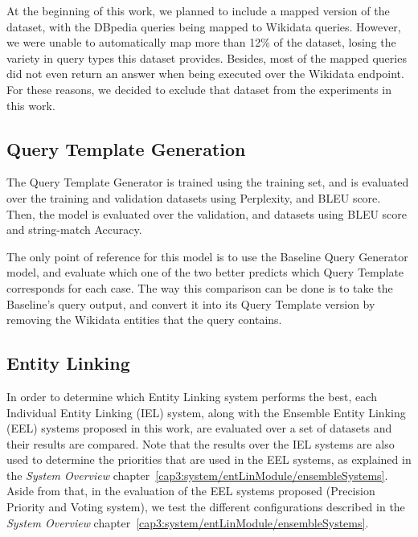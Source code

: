 At the beginning of this work, we planned to include a mapped version of the 
\DBNQA{}~\cite{dataset:dbnqa-hartmann-marx-soru-2018} dataset,
with the DBpedia queries being mapped to Wikidata queries. However, we were unable 
to automatically map more than 12\% of the dataset, losing the variety in query types this 
dataset provides. Besides, most of the mapped queries did not even return an answer when 
being executed over the Wikidata endpoint. For these reasons, we decided to exclude 
that dataset from the experiments in this work.

\subsection{Query Template Generation}
\label{cap4:experimentalDesign/queryTemplateGeneration}
The Query Template Generator is trained using the \LCQuADtwo{} training set, and is 
evaluated over the training and validation datasets using Perplexity, and BLEU score. 
Then, the model is evaluated over the \LCQuADtwo{} validation, \QALDseven{} and 
\WikiSPARQL{} datasets using BLEU score and string-match Accuracy.

The only point of reference for this model is to use the Baseline Query Generator model, and 
evaluate which one of the two better predicts which Query Template corresponds for each case. 
The way this comparison can be done is to take the Baseline's \SPARQL{} query output, and convert it 
into its Query Template version by removing the Wikidata entities that the query contains.

\subsection{Entity Linking}
\label{cap4:experimentalDesign/entityLinking}
In order to determine which Entity Linking system performs the best, each Individual Entity 
Linking (IEL) system, along with the Ensemble Entity Linking (EEL) systems proposed in this work, 
are evaluated over a set of datasets and their results are compared. Note that the results over 
the IEL systems are also used to determine the priorities that are used in the EEL systems, as 
explained in the \textit{System Overview} chapter~\ref{cap3:system/entLinModule/ensembleSystems}. 
Aside from that, in the evaluation of 
the EEL systems proposed (Precision Priority and Voting system), we test the different 
configurations described in the \textit{System Overview} chapter~\ref{cap3:system/entLinModule/ensembleSystems}. 

